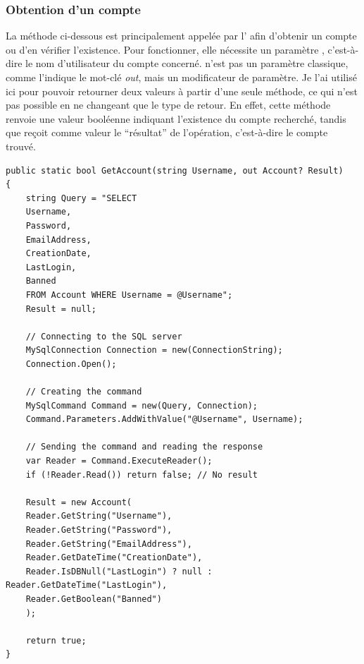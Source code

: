 \documentclass[12pt]{report}
\begin{document}
\subsubsection{Obtention d’un compte}

La méthode ci-dessous est principalement appelée par l’ afin d’obtenir un compte ou d’en vérifier l’existence. Pour fonctionner, elle nécessite un paramètre , c’est-à-dire le nom d’utilisateur du compte concerné.  n’est pas un paramètre classique, comme l’indique le mot-clé \textit{out}, mais un modificateur de paramètre. Je l’ai utilisé ici pour pouvoir retourner deux valeurs à partir d’une seule méthode, ce qui n’est pas possible en ne changeant que le type de retour. En effet, cette méthode renvoie une valeur booléenne indiquant l’existence du compte recherché, tandis que  reçoit comme valeur le “résultat” de l’opération, c’est-à-dire le compte trouvé.

\begin{verbatim}
public static bool GetAccount(string Username, out Account? Result)
{
	string Query = "SELECT 
	Username, 
	Password, 
	EmailAddress, 
	CreationDate, 
	LastLogin, 
	Banned 
	FROM Account WHERE Username = @Username";
	Result = null;
	
	// Connecting to the SQL server
	MySqlConnection Connection = new(ConnectionString);
	Connection.Open();
	
	// Creating the command
	MySqlCommand Command = new(Query, Connection);
	Command.Parameters.AddWithValue("@Username", Username);
	
	// Sending the command and reading the response
	var Reader = Command.ExecuteReader();
	if (!Reader.Read()) return false; // No result
	
	Result = new Account(
	Reader.GetString("Username"),
	Reader.GetString("Password"),
	Reader.GetString("EmailAddress"),
	Reader.GetDateTime("CreationDate"),
	Reader.IsDBNull("LastLogin") ? null : Reader.GetDateTime("LastLogin"),
	Reader.GetBoolean("Banned")
	);
	
	return true;
}
\end{verbatim}
\end{document}

